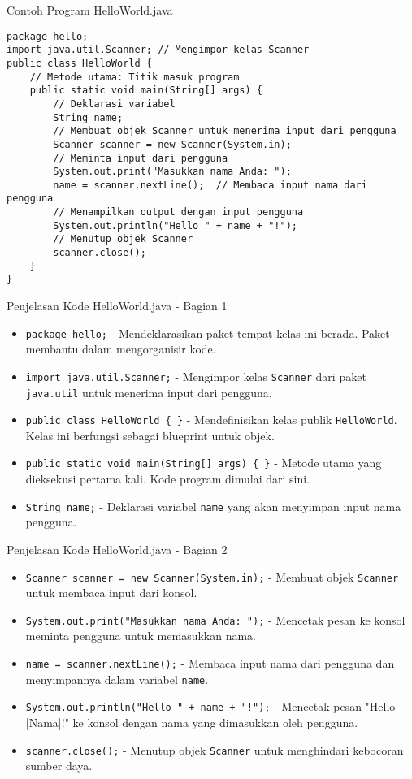 \documentclass[aspectratio=169, table]{beamer}
\begin{document}
\begin{frame}[fragile]{Contoh Program HelloWorld.java}
\vspace{20pt}
\begin{lstlisting}[style=JavaStyle, caption={Contoh Program HelloWorld.java}]
package hello;
import java.util.Scanner; // Mengimpor kelas Scanner
public class HelloWorld {
	// Metode utama: Titik masuk program
	public static void main(String[] args) {
		// Deklarasi variabel
		String name;
		// Membuat objek Scanner untuk menerima input dari pengguna
		Scanner scanner = new Scanner(System.in);
		// Meminta input dari pengguna
		System.out.print("Masukkan nama Anda: ");
		name = scanner.nextLine();  // Membaca input nama dari pengguna
		// Menampilkan output dengan input pengguna
		System.out.println("Hello " + name + "!");
		// Menutup objek Scanner
		scanner.close();
	}
}
\end{lstlisting}
\end{frame}

\begin{frame}[fragile]{Penjelasan Kode HelloWorld.java - Bagian 1}
\begin{itemize}
\item \texttt{package hello;} - Mendeklarasikan paket tempat kelas ini berada. Paket membantu dalam mengorganisir kode.
\item \texttt{import java.util.Scanner;} - Mengimpor kelas \texttt{Scanner} dari paket \texttt{java.util} untuk menerima input dari pengguna.
\item \texttt{public class HelloWorld \{ \}} - Mendefinisikan kelas publik \texttt{HelloWorld}. Kelas ini berfungsi sebagai blueprint untuk objek.
\item \texttt{public static void main(String[] args) \{ \}} - Metode utama yang dieksekusi pertama kali. Kode program dimulai dari sini.
\item \texttt{String name;} - Deklarasi variabel \texttt{name} yang akan menyimpan input nama pengguna.
\end{itemize}
\end{frame}

\begin{frame}[fragile]{Penjelasan Kode HelloWorld.java - Bagian 2}
\begin{itemize}
\item \texttt{Scanner scanner = new Scanner(System.in);} - Membuat objek \texttt{Scanner} untuk membaca input dari konsol.
\item \texttt{System.out.print("Masukkan nama Anda: ");} - Mencetak pesan ke konsol meminta pengguna untuk memasukkan nama.
\item \texttt{name = scanner.nextLine();} - Membaca input nama dari pengguna dan menyimpannya dalam variabel \texttt{name}.
\item \texttt{System.out.println("Hello " + name + "!");} - Mencetak pesan "Hello [Nama]!" ke konsol dengan nama yang dimasukkan oleh pengguna.
\item \texttt{scanner.close();} - Menutup objek \texttt{Scanner} untuk menghindari kebocoran sumber daya.
\end{itemize}
\end{frame}
\end{document}
